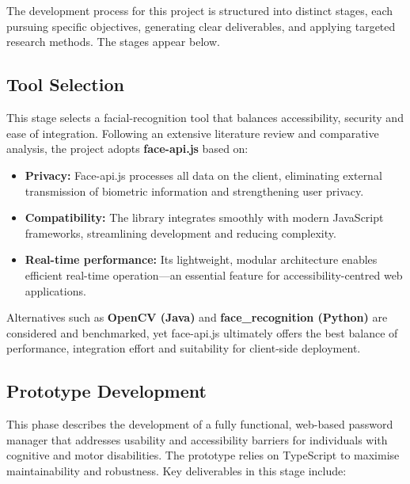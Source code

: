 
\chapter{}%
\label{ch:methodologie}

The development process for this project is structured into distinct stages, each pursuing specific objectives, generating clear deliverables, and applying targeted research methods. The stages appear below.

\section{Tool Selection}
This stage selects a facial-recognition tool that balances accessibility, security and ease of integration.  
Following an extensive literature review and comparative analysis, the project adopts \textbf{face-api.js} based on:

\begin{itemize}
  \item \textbf{Privacy:} Face-api.js processes all data on the client, eliminating external transmission of biometric information and strengthening user privacy.
  \item \textbf{Compatibility:} The library integrates smoothly with modern 
  Java\-Script frameworks, streamlining development and reducing complexity.
  \item \textbf{Real-time performance:} Its lightweight, modular architecture enables efficient real-time operation—an essential feature for accessibility-centred web applications.
\end{itemize}

Alternatives such as \textbf{OpenCV (Java)} and \textbf{face\_recognition (Python)} are considered and benchmarked, yet face-api.js ultimately offers the best balance of performance, integration effort and suitability for client-side deployment.

\section{Prototype Development}
This phase describes the development of a fully functional, web-based password manager that addresses usability and accessibility barriers for individuals with cognitive and motor disabilities. The prototype relies on TypeScript to maximise maintainability and robustness. Key deliverables in this stage include:

